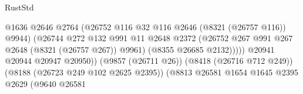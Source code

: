 \begin{lexlean}{RustStd}
\begin{coremodule}
                                                          @1636
                                                          @2646
                                                          @2764
                                                          (@26752
                                                            @116
                                                            @32
                                                            @116
                                                            @2646
                                                            (@8321 (@26757 @116))
                                                            @9944)
                                                          (@26744
                                                            @272
                                                            @132
                                                            @991
                                                            @11
                                                            @2648
                                                            @2372
                                                            (@26752
                                                              @267
                                                              @991
                                                              @267
                                                              @2648
                                                              (@8321 (@26757 @267))
                                                              @9961)
                                                            (@8355 @26685 @2132)))))
                                                    @20941
                                                    @20944
                                                    @20947
                                                    @20950))
                                                (@9857 (@26711 @26))
                                                (@8418 (@26716 @712 @249))
                                                (@8188 (@26723 @249 @102 @2625 @2395))
                                                (@8813
                                                  @26581
                                                  @1654
                                                  @1645
                                                  @2395
                                                  @2629
                                                  (@9640
                                                    @26581

\end{coremodule}
\end{lexlean}
